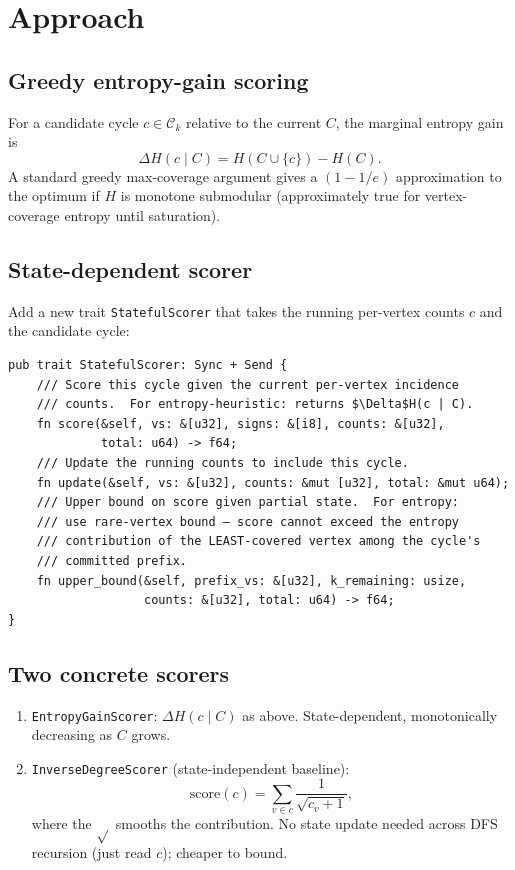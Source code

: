 \documentclass[a4paper,11pt]{article}
\begin{document}
\section*{Approach}

\subsection*{Greedy entropy-gain scoring}

For a candidate cycle $c \in \mathcal{C}_k$ relative to the current
$C$, the marginal entropy gain is
\[
  \Delta H(c \mid C) = H(C \cup \{c\}) - H(C).
\]
A standard greedy max-coverage argument gives a $(1 - 1/e)$
approximation to the optimum if $H$ is monotone submodular
(approximately true for vertex-coverage entropy until saturation).

\subsection*{State-dependent scorer}

Add a new trait \texttt{StatefulScorer} that takes the running
per-vertex counts $c$ and the candidate cycle:
\begin{lstlisting}
pub trait StatefulScorer: Sync + Send {
    /// Score this cycle given the current per-vertex incidence
    /// counts.  For entropy-heuristic: returns $\Delta$H(c | C).
    fn score(&self, vs: &[u32], signs: &[i8], counts: &[u32],
             total: u64) -> f64;
    /// Update the running counts to include this cycle.
    fn update(&self, vs: &[u32], counts: &mut [u32], total: &mut u64);
    /// Upper bound on score given partial state.  For entropy:
    /// use rare-vertex bound — score cannot exceed the entropy
    /// contribution of the LEAST-covered vertex among the cycle's
    /// committed prefix.
    fn upper_bound(&self, prefix_vs: &[u32], k_remaining: usize,
                   counts: &[u32], total: u64) -> f64;
}
\end{lstlisting}

\subsection*{Two concrete scorers}

\begin{enumerate}
  \item \texttt{EntropyGainScorer}: $\Delta H(c \mid C)$ as above.
    State-dependent, monotonically decreasing as $C$ grows.
  \item \texttt{InverseDegreeScorer} (state-independent baseline):
    \[
      \mathrm{score}(c) = \sum_{v \in c} \frac{1}{\sqrt{c_v + 1}},
    \]
    where the $\sqrt{}$ smooths the contribution.  No state update
    needed across DFS recursion (just read $c$); cheaper to bound.
\end{enumerate}
\end{document}
